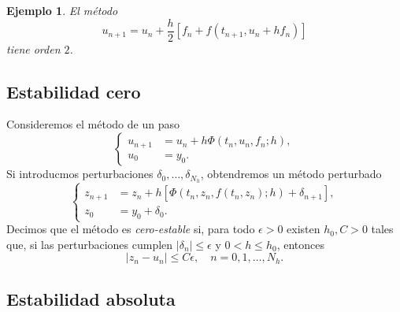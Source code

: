 \documentclass[11pt,letterpaper]{report}
\newtheorem{example}{Ejemplo}
\begin{document}
\begin{example}
  El método
  \begin{equation}
    u_{n+1} = u_n + \frac{h}{2}
    \left[ f_n + f(t_{n+1},u_n + hf_n) \right]
  \end{equation}
  tiene orden $2$.
\end{example}

\subsection{Estabilidad cero}

Consideremos el método de un paso
\begin{equation}
  \left\{
    \begin{aligned}
      u_{n+1} &= u_n + h\Phi(t_n,u_n,f_n;h),
      \\
      u_0 &= y_0.
    \end{aligned}
  \right.
\end{equation}
Si introducmos perturbaciones $\delta_0,\dots,\delta_{N_h}$,
obtendremos un método perturbado
\begin{equation}
  \left\{
    \begin{aligned}
      z_{n+1} &= z_n + h[\Phi(t_n,z_n,f(t_n,z_n);h) + \delta_{n+1}],
      \\
      z_0 &= y_0 + \delta_0.
    \end{aligned}
  \right.
\end{equation}
Decimos que el método es \emph{cero-estable} si, para todo
$\epsilon>0$ existen $h_0,C>0$ tales que, si las perturbaciones
cumplen $|\delta_n|\leq\epsilon$ y $0<h\leq h_0$, entonces
\begin{equation}
  |z_n - u_n| \leq C\epsilon, \quad n=0,1,\dots,N_h
.\end{equation}


\subsection{Estabilidad absoluta}
\end{document}

